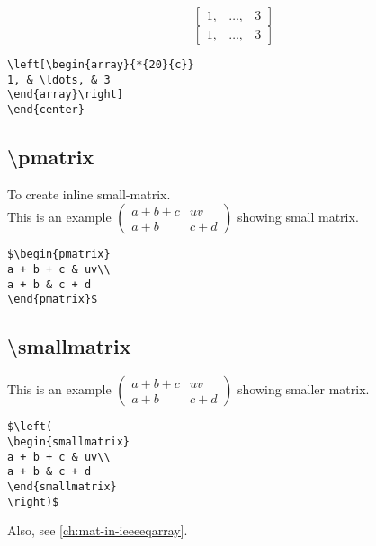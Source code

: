 \documentclass[journal]{IEEEtran}
\begin{document}
\noindent \dotfill

$$\left[\begin{array}{ccc} 
1, & \ldots, & 3 
\end{array}\right] $$
$$\left[\begin{array}{*{20}{c}} 
1, & \ldots, & 3 
\end{array}\right] $$

\begin{verbatim}
\left[\begin{array}{*{20}{c}} 
1, & \ldots, & 3 
\end{array}\right]
\end{center}
\end{verbatim}


\noindent \dotfill
\subsection{\textbackslash pmatrix}
To create inline small-matrix.\\[6pt]

\noindent This is an example 
$\begin{pmatrix}
a + b + c & uv\\
a + b & c + d
\end{pmatrix}$ 
showing small matrix.

\begin{verbatim}
$\begin{pmatrix}
a + b + c & uv\\
a + b & c + d
\end{pmatrix}$
\end{verbatim}



\noindent \dotfill
\subsection{\textbackslash smallmatrix}
This is an example $\left(
\begin{smallmatrix}
a + b + c & uv\\
a + b & c + d
\end{smallmatrix}
\right)$ showing smaller matrix.


\begin{verbatim}
$\left(
\begin{smallmatrix}
a + b + c & uv\\ 
a + b & c + d    
\end{smallmatrix} 
\right)$ 
\end{verbatim}


Also, see \ref{ch:mat-in-ieeeeqarray}.\\


\noindent \dotfill

%
\end{document}
